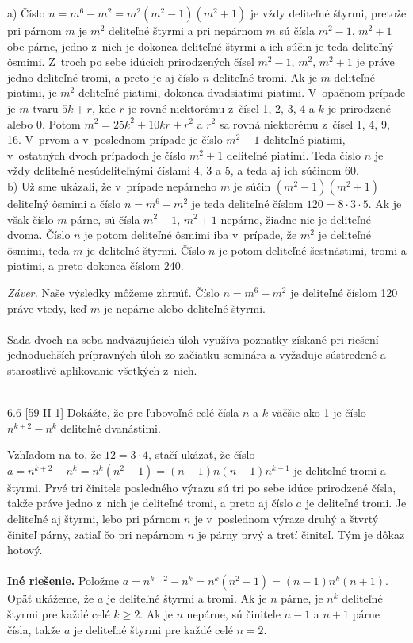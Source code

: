 \rieh a) Číslo $n = m^6 -m^2 = m^2 (m^2-1)(m^2 +1)$ je vždy deliteľné štyrmi, pretože pri párnom $m$ je $m^2$ deliteľné štyrmi a pri nepárnom $m$ sú čísla $m^2-1$, $m^2 +1$ obe párne, jedno z~nich je dokonca deliteľné štyrmi a ich súčin je teda deliteľný ôsmimi. Z~troch po sebe idúcich prirodzených čísel $m^2-1$, $m^2$, $m^2 + 1$ je práve jedno deliteľné tromi, a preto je aj číslo $n$ deliteľné tromi. Ak je $m$ deliteľné piatimi, je $m^2$ deliteľné piatimi, dokonca dvadsiatimi piatimi. V~opačnom prípade je $m$ tvaru $5k + r$, kde $r$ je rovné niektorému z~čísel 1, 2, 3, 4 a $k$ je prirodzené alebo 0. Potom $m^2 = 25k^2 + 10kr + r^2$ a $r^2$ sa rovná niektorému z~čísel 1, 4, 9, 16. V~prvom a v~poslednom prípade je číslo $m^2-1$ deliteľné piatimi, v~ostatných dvoch prípadoch je číslo $m^2 + 1$ deliteľné piatimi. Teda číslo $n$ je vždy deliteľné nesúdeliteľnými číslami 4, 3 a 5, a teda aj ich súčinom 60.\\

b) Už sme ukázali, že v~prípade nepárneho $m$ je súčin $(m^2-1)(m^2 + 1)$ deliteľný ôsmimi a číslo $n = m^6- m^2$ je teda deliteľné číslom $120 = 8 \cdot 3 \cdot 5$. Ak je však číslo $m$ párne, sú čísla $m^2 -1$, $m^2 + 1$ nepárne, žiadne nie je deliteľné dvoma. Číslo $n$ je potom deliteľné ôsmimi iba v~prípade, že $m^2$ je deliteľné ôsmimi, teda $m$ je deliteľné štyrmi. Číslo $n$ je potom deliteľné šestnástimi, tromi a piatimi, a preto dokonca číslom 240.

\textit{Záver.} Naše výsledky môžeme zhrnúť. Číslo $n = m^6 - m^2$ je deliteľné číslom 120 práve vtedy, keď $m$ je nepárne alebo deliteľné štyrmi.\\
\\
\kom Sada dvoch na seba nadväzujúcich úloh využíva poznatky získané pri riešení jednoduchších prípravných úloh zo začiatku seminára a vyžaduje sústredené a starostlivé aplikovanie všetkých z~nich.\\
\\
\begin{tcolorbox}[breakable,notitle,boxrule=0pt,colback=light-gray,colframe=light-gray]\ul{6.6} [59-II-1]
Dokážte, že pre ľubovoľné celé čísla $n$ a $k$ väčšie ako 1 je číslo $n^{k+2} - n^k$ deliteľné dvanástimi.

\end{tcolorbox}

\rieh Vzhľadom na to, že $12 = 3 \cdot 4$, stačí ukázať, že číslo $a = n^{k+2} -  {n^k} = n^k (n^2 - 1) = (n - 1)n(n + 1)n^{k-1}$ je deliteľné tromi a štyrmi. Prvé tri činitele posledného výrazu sú tri po sebe idúce prirodzené čísla, takže práve jedno z~nich je deliteľné tromi, a preto aj číslo $a$ je deliteľné tromi. Je deliteľné aj štyrmi, lebo pri párnom $n$ je v~poslednom výraze druhý a štvrtý činiteľ párny, zatiaľ čo pri nepárnom $n$ je párny prvý a tretí činiteľ. Tým je dôkaz hotový.\\
\\
\textbf{Iné riešenie.} Položme $a = n^{k+2} - n^k = n^k (n^2 - 1) = (n - 1)n^k (n + 1)$. Opäť ukážeme, že $a$ je deliteľné štyrmi a tromi. Ak je $n$ párne, je $n^k$ deliteľné štyrmi pre každé celé $k \geq 2$. Ak je $n$ nepárne, sú činitele $n - 1$ a $n + 1$ párne čísla, takže $a$ je deliteľné štyrmi pre každé celé $n = 2$.

